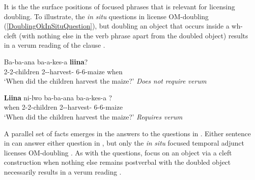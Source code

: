 \documentclass[output=paper]{langscibook}
\begin{document}


It is the the surface positions of focused phrases that is relevant for licensing doubling. To illustrate, the \textit{in situ} questions in  license OM-doubling (\ref{DoublingOkInSituQuestion}), but doubling an object that occurs inside a wh-cleft (with nothing else in the verb phrase apart from the doubled object) results in a verum reading of the clause . 

\ea \label{ex:sikuku:InSituExSituQuestions}
\begin{xlist}

\ex \label{DoublingOkInSituQuestion}
\gll Ba-ba-ana ba-a-kes-a  \textbf{liina}? \\
2-2-children 2\Sm-\Om-harvest-\Fv{} 6-6-maize when \\
\glt `When did the children harvest the maize?' \textit{Does not require verum}

\ex \label{ex:sikuku:VerumExSituQuestion}
\gll \textbf{Liina} ni-lwo ba-ba-ana ba-a-kes-a ? \\
when  2-2-children 2\Sm-\Om-harvest-\Fv{} 6-6-maize  \\
\glt `When did the children harvest the maize?' \textit{Requires verum}

\end{xlist}
\z

A parallel set of facts emerges in the answers to the questions in . Either sentence in  can answer either question in , but only the \textit{in situ} focused temporal adjunct licenses OM-doubling . As with the questions, focus on an object via a cleft construction when nothing else remains postverbal with the doubled object necessarily results in a verum reading .
\end{document}

